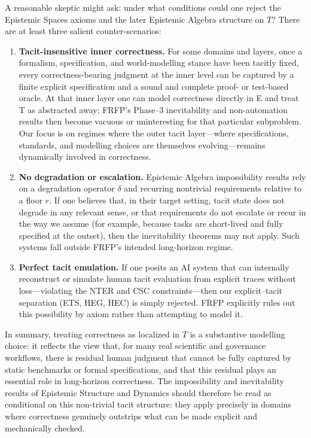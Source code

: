 A reasonable skeptic might ask: under what conditions could one reject the Epistemic Spaces axioms
and the later Epistemic Algebra structure on $T$? There are at least three salient counter-scenarios:
\begin{enumerate}
  \item \textbf{Tacit-insensitive inner correctness.}
For some domains and layers, once a formalism, specification, and world-modelling stance have been tacitly fixed,
every correctness-bearing judgment at the inner level can be captured by a finite explicit specification and a sound
and complete proof- or test-based oracle.
At that inner layer one can model correctness directly in E and treat T as abstracted away; FRFP’s Phase–3
inevitability and non-automation results then become vacuous or uninteresting for that particular subproblem.
Our focus is on regimes where the outer tacit layer—where specifications, standards, and modelling choices are
themselves evolving—remains dynamically involved in correctness.

  \item \textbf{No degradation or escalation.} Epistemic Algebra impossibility results rely on a
  degradation operator $\delta$ and recurring nontrivial requirements relative to a floor $r$.
  If one believes that, in their target setting, tacit state does not degrade in any relevant
  sense, or that requirements do not escalate or recur in the way we assume (for example,
  because tasks are short-lived and fully specified at the outset), then the inevitability
  theorems may not apply. Such systems fall outside FRFP's intended long-horizon regime.
  \item \textbf{Perfect tacit emulation.} If one posits an AI system that can internally
  reconstruct or simulate human tacit evaluation from explicit traces without loss---violating
  the NTER and CSC constraints---then our explicit--tacit separation (ETS, HEG, HEC) is simply
  rejected. FRFP explicitly rules out this possibility by axiom rather than attempting to model
  it.
\end{enumerate}

In summary, treating correctness as localized in $T$ is a substantive modelling choice:
it reflects the view that, for many real scientific and governance workflows, there is residual
human judgment that cannot be fully captured by static benchmarks or formal specifications, and
that this residual plays an essential role in long-horizon correctness. The impossibility and
inevitability results of Epistemic Structure and Dynamics should therefore be read as conditional on this non-trivial
tacit structure: they apply precisely in domains where correctness genuinely outstrips what can
be made explicit and mechanically checked.



